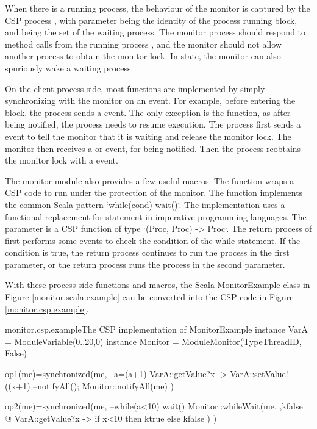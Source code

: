 \documentclass[a4paper, 12pt]{article}
\begin{document}
When there is a running process, the behaviour of the monitor is captured by the CSP process , with parameter  being the identity of the process running  block, and  being the set of the waiting process. The monitor process should respond to method calls from the running process , and the monitor should not allow another process to obtain the monitor lock. In  state, the monitor can also spuriously wake a waiting process. 

On the client process side, most functions are implemented by simply synchronizing with the monitor on an event. For example, before entering the  block, the process sends a  event. The only exception is the  function, as after being notified, the process needs to resume execution. The process first sends a  event to tell the monitor that it is waiting and release the monitor lock. The monitor then receives a  or  event, for being notified. Then the process reobtains the monitor lock with a  event. 

The monitor module also provides a few useful macros. The  function wraps a CSP code to run under the protection of the monitor. The  function implements the common Scala pattern `while(cond) wait()`. The implementation uses a functional replacement for  statement in imperative programming languages. The  parameter is a CSP function of type `(Proc, Proc) -> Proc`. The return process of  first performs some events to check the condition of the while statement. If the condition is true, the return process continues to run the process in the first parameter, or the return process runs the process in the second parameter.

With these process side functions and macros, the Scala MonitorExample class in Figure \ref{monitor.scala.example} can be converted into the CSP code in Figure \ref{monitor.csp.example}.

\begin{cspinline}{monitor.csp.example}{The CSP implementation of MonitorExample}
instance VarA = ModuleVariable({0..20},0)
instance Monitor = ModuleMonitor(TypeThreadID, False)

op1(me)=synchronized(me,
  --a=(a+1)%
  VarA::getValue?x -> VarA::setValue!((x+1)%
  --notifyAll();
  Monitor::notifyAll(me)
)

op2(me)=synchronized(me,
  --while(a<10) wait()
  Monitor::whileWait(me, \ktrue,kfalse @
    VarA::getValue?x -> if x<10 then ktrue else kfalse
  )
)
\end{cspinline}
  
\end{document}

